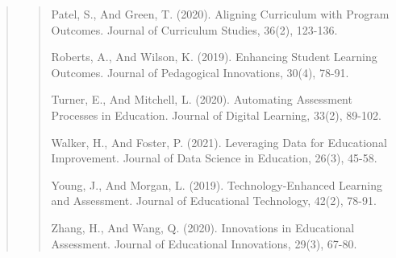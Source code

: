 \documentclass[12pt]{report}
\begin{document}
\begin{quote}
\begin{quote}
			Patel, S., And Green, T. (2020). Aligning Curriculum with Program Outcomes. Journal of Curriculum Studies, 36(2), 123-136.
			
			Roberts, A., And Wilson, K. (2019). Enhancing Student Learning Outcomes. Journal of Pedagogical Innovations, 30(4), 78-91.
			\clearpage
			
			Turner, E., And Mitchell, L. (2020). Automating Assessment Processes in Education. Journal of Digital Learning, 33(2), 89-102.
			
			Walker, H., And Foster, P. (2021). Leveraging Data for Educational Improvement. Journal of Data Science in Education, 26(3), 45-58.
			
			Young, J., And Morgan, L. (2019). Technology-Enhanced Learning and Assessment. Journal of Educational Technology, 42(2), 78-91.
			
			Zhang, H., And Wang, Q. (2020). Innovations in Educational Assessment. Journal of Educational Innovations, 29(3), 67-80.
		\end{quote}
	\end{quote}
	
\end{document}
